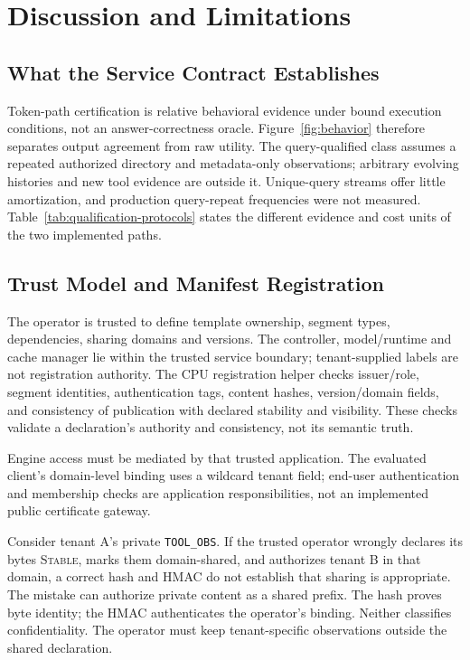 \section{Discussion and Limitations}
\label{sec:discussion}

\subsection{What the Service Contract Establishes}
Token-path certification is relative behavioral evidence under bound execution conditions, not an answer-correctness oracle. Figure~\ref{fig:behavior} therefore separates output agreement from raw utility. The query-qualified class assumes a repeated authorized directory and metadata-only observations; arbitrary evolving histories and new tool evidence are outside it. Unique-query streams offer little amortization, and production query-repeat frequencies were not measured. Table~\ref{tab:qualification-protocols} states the different evidence and cost units of the two implemented paths.

\subsection{Trust Model and Manifest Registration}
\label{sec:trust}
The operator is trusted to define template ownership, segment types, dependencies, sharing domains and versions. The controller, model/runtime and cache manager lie within the trusted service boundary; tenant-supplied labels are not registration authority. The CPU registration helper checks issuer/role, segment identities, authentication tags, content hashes, version/domain fields, and consistency of publication with declared stability and visibility. These checks validate a declaration's authority and consistency, not its semantic truth.

Engine access must be mediated by that trusted application. The evaluated client's domain-level binding uses a wildcard tenant field; end-user authentication and membership checks are application responsibilities, not an implemented public certificate gateway.

Consider tenant A's private \texttt{TOOL\_OBS}. If the trusted operator wrongly declares its bytes \textsc{Stable}, marks them domain-shared, and authorizes tenant B in that domain, a correct hash and HMAC do not establish that sharing is appropriate. The mistake can authorize private content as a shared prefix. The hash proves byte identity; the HMAC authenticates the operator's binding. Neither classifies confidentiality. The operator must keep tenant-specific observations outside the shared declaration.

